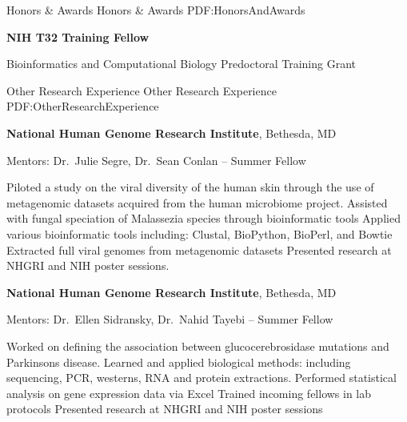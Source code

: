 \documentclass[letterpaper,MMMyyyy,nonstopmode]{simpleresumecv}
\begin{document}
\begin{Body}
\Section
{Honors \&\newline
Awards}
{Honors \& Awards}
{PDF:HonorsAndAwards}

\BulletItem
\textbf{NIH T32 Training Fellow}
\hfill
{}
\begin{Detail}
\Item
Bioinformatics and Computational Biology Predoctoral Training Grant
\end{Detail}

\newpage


\Section
{Other Research\newline
Experience}
{Other Research Experience}
{PDF:OtherResearchExperience}

\Entry
{\textbf{National Human Genome Research Institute}},
Bethesda, MD

\Gap
\BulletItem
Mentors: Dr.~Julie Segre, Dr.~Sean Conlan
\hfill
{}--
\newline
Summer Fellow
\begin{Detail}
\SubBulletItem
Piloted a study on the viral diversity of the human skin through the use of metagenomic datasets acquired from the human microbiome project.
\SubBulletItem
Assisted with fungal speciation of Malassezia species through bioinformatic tools
\SubBulletItem
Applied various bioinformatic tools including: Clustal, BioPython, BioPerl, and Bowtie
\SubBulletItem
Extracted full viral genomes from metagenomic datasets
\SubBulletItem
Presented research at NHGRI and NIH poster sessions.

\end{Detail}

\Entry
{\textbf{National Human Genome Research Institute}},
Bethesda, MD

\Gap
\BulletItem
Mentors: Dr.~Ellen Sidransky, Dr.~Nahid Tayebi
\hfill
{}--
\newline
Summer Fellow
\begin{Detail}
\SubBulletItem
Worked on defining the association between glucocerebrosidase mutations and Parkinsons disease.
\SubBulletItem
Learned and applied biological methods: including sequencing, PCR, westerns, RNA and protein extractions.
\SubBulletItem
Performed statistical analysis on gene expression data via Excel
\SubBulletItem
Trained incoming fellows in lab protocols
\SubBulletItem
Presented research at NHGRI and NIH poster sessions
\end{Detail}



\end{Body}
\end{document}
